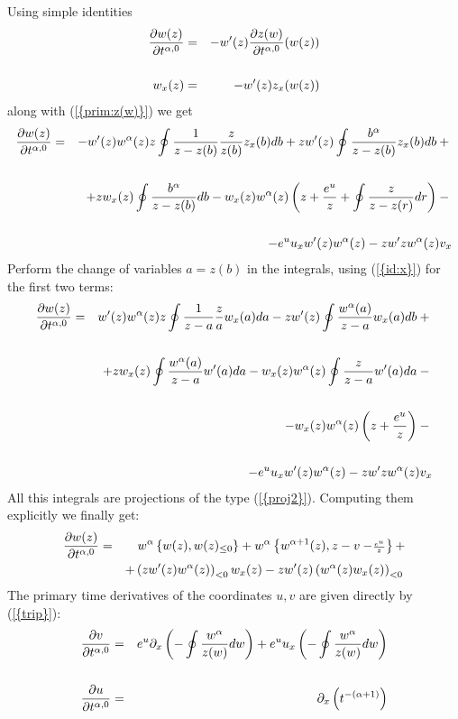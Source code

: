 \documentclass[numbook, envcountsame, envcountreset]{svjour3}
\begin{document}
Using simple identities
\begin{eqnarray}
\frac{{\partial} w(z)}{{\partial} t^{\alpha,0}}&=&-w'(z)\frac{{\partial} z(w)}{{\partial} t^{\alpha,0}}(w(z))\label{id:t}\\
&&
{\nonumber}\\
w_x(z)&=&-w'(z)z_x(w(z))\label{id:x} 
\end{eqnarray}
along with {(\ref{{prim:z(w)}})} we get
\begin{eqnarray}
\frac{{\partial} w(z)}{{\partial} t^{\alpha,0}}&=&-w'(z)w^\alpha(z)z\oint\frac{1}{z-z(b)}\frac{z}{z(b)}z_x(b)db+
z w'(z)\oint\frac{b^\alpha}{z-z(b)}z_x(b)db+{\nonumber}\\
&&
{\nonumber}\\
&&+z w_x(z)\oint\frac{b^\alpha}{z-z(b)}db-
w_x(z) w^\alpha(z) \left(z+\frac{e^u}{z}+\oint\frac{z}{z-z(r)}dr \right)-{\nonumber}\\
&&
{\nonumber}\\
&&-e^u u_x w'(z) w^\alpha(z)-z w'z w^\alpha(z) v_x
\end{eqnarray}
Perform the change of variables $a=z(b)$ in the integrals, using {(\ref{{id:x}})} for the first two terms:
\begin{eqnarray}
\frac{{\partial} w(z)}{{\partial} t^{\alpha,0}}&=&w'(z)w^\alpha(z)z\oint\frac{1}{z-a}\frac{z}{a}w_x(a)da-
z w'(z)\oint\frac{w^\alpha(a)}{z-a}w_x(a)db+{\nonumber}\\
&&
{\nonumber}\\
&&+z w_x(z)\oint\frac{w^\alpha(a)}{z-a}w'(a)da-w_x(z)w^\alpha(z)\oint\frac{z}{z-a}w'(a)da-{\nonumber}\\
&&
{\nonumber}\\
&&-w_x(z) w^\alpha(z) \left(z+\frac{e^u}{z}\right)-{\nonumber}\\
&&
{\nonumber}\\
&&-e^u u_x w'(z) w^\alpha(z)-z w'z w^\alpha(z) v_x
\end{eqnarray}
All this integrals are projections of the type {(\ref{{proj2}})}. Computing them explicitly we finally get:
\begin{eqnarray}
\frac{{\partial} w(z)}{{\partial} t^{\alpha,0}} &=& w^{\alpha}\left\{ w(z), w(z)_{\leq 0} \right\}+
w^{\alpha} \left\{ w^{\alpha+1}(z), z-v-\scriptstyle{\frac{e^u}z} \right\}+\label{prim:w}\\ 
&&
+\left(z w'(z) w^{\alpha}(z)\right)_{<0}w_x(z) - z w'(z)\left( w^{\alpha}(z)w_x(z)\right)_{<0}{\nonumber}
\end{eqnarray}
The primary time derivatives of the coordinates $u,v$ are given directly by {(\ref{{trip}})}:
\begin{eqnarray}
\frac{{\partial} v}{{\partial} t^{\alpha,0}}&=&e^u {\partial}_x \left(-\oint\frac{w^\alpha}{z(w)}dw\right)+e^uu_x \left(-\oint\frac{w^\alpha}{z(w)}dw\right)\label{prim:v}\\
&&
{\nonumber}\\
\frac{{\partial} u}{{\partial} t^{\alpha,0}}&=&{\partial}_x\left(t^{-(\alpha+1)}\right)\label{prim:u}
\end{eqnarray}
\end{document}
